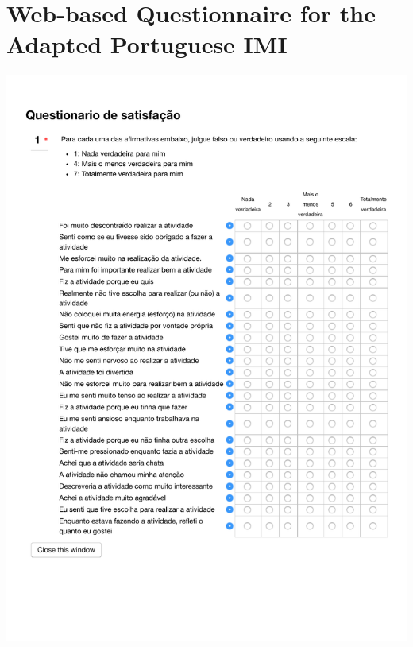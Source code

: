 \section[Web-based Questionnaire for the Adapted Portuguese IMI]{Web-based Questionnaire for the Adapted Portuguese IMI}
\label{annex:IMI-pilot-study}
\includegraphics[width=1\textwidth]{images/annex/IMI-pilot-study.pdf}

\newpage
